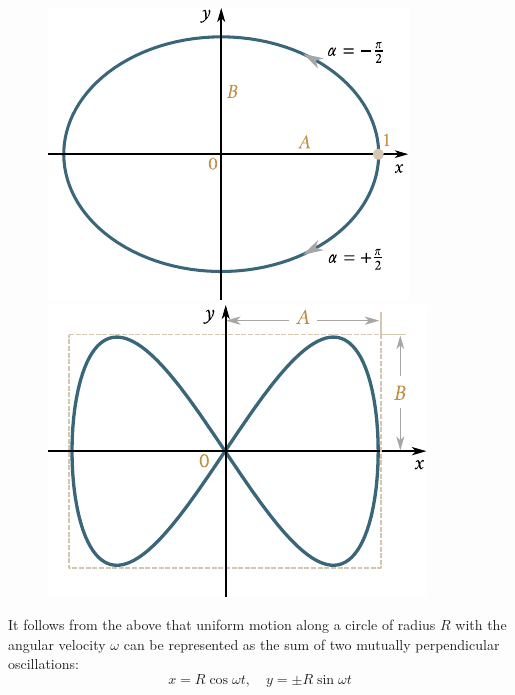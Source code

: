 \begin{figure}[t]
	\begin{minipage}[t]{0.5\linewidth}
		\begin{center}
			\includegraphics[scale=0.95]{figures/ch_07/fig_7_15.pdf}
			\caption[]{}
			\label{fig:7_15}
		\end{center}
	\end{minipage}
	\hspace{-0.0cm}
	\begin{minipage}[t]{0.5\linewidth}
		\begin{center}
			\includegraphics[scale=0.95]{figures/ch_07/fig_7_16.pdf}
			\caption[]{}
			\label{fig:7_16}
		\end{center}
	\end{minipage}
	\vspace{-0.6cm}
\end{figure}

It follows from the above that uniform motion along a circle of radius $R$ with the angular velocity $\omega$ can be represented as the sum of two mutually perpendicular oscillations:
\begin{equation}\label{eq:7_97}
	x = R\cos\omega t,\quad y = \pm R\sin\omega t
\end{equation}

